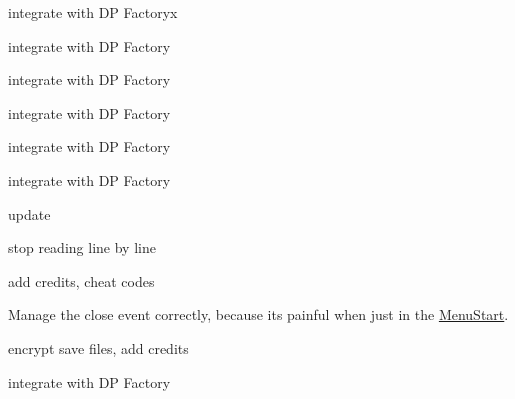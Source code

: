 
\begin{DoxyRefList}
\item[\label{todo__todo000001}%
\hypertarget{todo__todo000001}{}%
Class \hyperlink{class_b___movable}{B\+\_\+\+Movable} ]integrate with D\+P Factoryx  
\item[\label{todo__todo000002}%
\hypertarget{todo__todo000002}{}%
Class \hyperlink{class_b___wall}{B\+\_\+\+Wall} ]integrate with D\+P Factory  
\item[\label{todo__todo000003}%
\hypertarget{todo__todo000003}{}%
Class \hyperlink{class_b___water}{B\+\_\+\+Water} ]integrate with D\+P Factory  
\item[\label{todo__todo000004}%
\hypertarget{todo__todo000004}{}%
Class \hyperlink{class_e___loup}{E\+\_\+\+Loup} ]integrate with D\+P Factory  
\item[\label{todo__todo000005}%
\hypertarget{todo__todo000005}{}%
Class \hyperlink{class_e___renard}{E\+\_\+\+Renard} ]integrate with D\+P Factory  
\item[\label{todo__todo000006}%
\hypertarget{todo__todo000006}{}%
Class \hyperlink{class_ennemi}{Ennemi} ]integrate with D\+P Factory  
\item[\label{todo__todo000008}%
\hypertarget{todo__todo000008}{}%
Class \hyperlink{class_gameboard}{Gameboard} ]update  
\item[\label{todo__todo000009}%
\hypertarget{todo__todo000009}{}%
Class \hyperlink{class_level}{Level} ]stop reading line by line  
\item[\label{todo__todo000011}%
\hypertarget{todo__todo000011}{}%
Class \hyperlink{class_m___pause}{M\+\_\+\+Pause} ]add credits, cheat codes  
\item[\label{todo__todo000012}%
\hypertarget{todo__todo000012}{}%
Class \hyperlink{class_main_game}{Main\+Game} ]Manage the close event correctly, because it\textquotesingle{}s painful when just in the \hyperlink{class_menu_start}{Menu\+Start}.  
\item[\label{todo__todo000010}%
\hypertarget{todo__todo000010}{}%
Class \hyperlink{class_menu_start}{Menu\+Start} ]encrypt save files, add credits  
\item[\label{todo__todo000007}%
\hypertarget{todo__todo000007}{}%
Class \hyperlink{structslide_bloc}{slide\+Bloc} ]integrate with D\+P Factory 
\end{DoxyRefList}